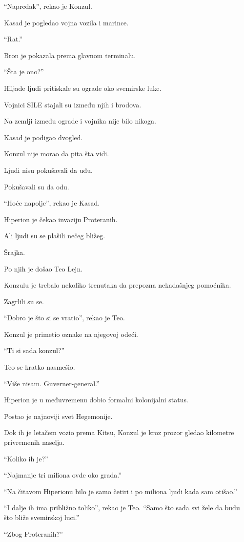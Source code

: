 ``Napredak'', rekao je Konzul.

Kasad je pogledao vojna vozila i marince.

``Rat.''

Bron je pokazala prema glavnom terminalu.

``Šta je ono?''

Hiljade ljudi pritiskale su ograde oko svemirske luke.

Vojnici SILE stajali su između njih i brodova.

Na zemlji između ograde i vojnika nije bilo nikoga.

Kasad je podigao dvogled.

Konzul nije morao da pita šta vidi.

Ljudi nisu pokušavali da uđu.

Pokušavali su da odu.

``Hoće napolje'', rekao je Kasad.

Hiperion je čekao invaziju Proteranih.

Ali ljudi su se plašili nečeg bližeg.

Šrajka.

\bigskip

Po njih je došao Teo Lejn.

Konzulu je trebalo nekoliko trenutaka da prepozna nekadašnjeg pomoćnika.

Zagrlili su se.

``Dobro je što si se vratio'', rekao je Teo.

Konzul je primetio oznake na njegovoj odeći.

``Ti si sada konzul?''

Teo se kratko nasmešio.

``Više nisam. Guverner-general.''

Hiperion je u međuvremenu dobio formalni kolonijalni status.

Postao je najnoviji svet Hegemonije.

Dok ih je letačem vozio prema Kitsu, Konzul je kroz prozor gledao kilometre privremenih naselja.

``Koliko ih je?''

``Najmanje tri miliona ovde oko grada.''

``Na čitavom Hiperionu bilo je samo četiri i po miliona ljudi kada sam otišao.''

``I dalje ih ima približno toliko'', rekao je Teo. ``Samo što sada svi žele da budu što bliže svemirskoj luci.''

``Zbog Proteranih?''

